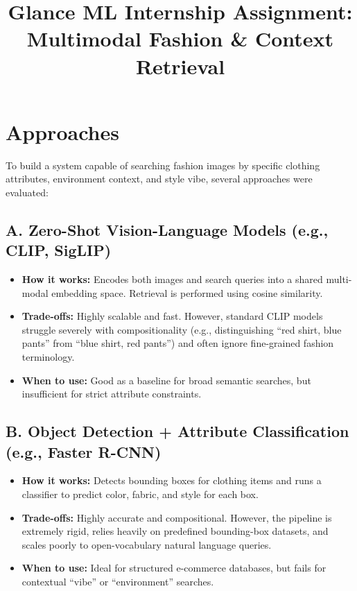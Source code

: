 \documentclass[11pt,a4paper]{article}
\title{Glance ML Internship Assignment: \\ Multimodal Fashion \& Context Retrieval}
\author{}
\date{}
\begin{document}
\maketitle

\section{Approaches}
To build a system capable of searching fashion images by specific clothing attributes, environment context, and style vibe, several approaches were evaluated:

\subsection*{A. Zero-Shot Vision-Language Models (e.g., CLIP, SigLIP)}
\begin{itemize}
    \item \textbf{How it works:} Encodes both images and search queries into a shared multi-modal embedding space. Retrieval is performed using cosine similarity.
    \item \textbf{Trade-offs:} Highly scalable and fast. However, standard CLIP models struggle severely with compositionality (e.g., distinguishing ``red shirt, blue pants'' from ``blue shirt, red pants'') and often ignore fine-grained fashion terminology.
    \item \textbf{When to use:} Good as a baseline for broad semantic searches, but insufficient for strict attribute constraints.
\end{itemize}

\subsection*{B. Object Detection + Attribute Classification (e.g., Faster R-CNN)}
\begin{itemize}
    \item \textbf{How it works:} Detects bounding boxes for clothing items and runs a classifier to predict color, fabric, and style for each box.
    \item \textbf{Trade-offs:} Highly accurate and compositional. However, the pipeline is extremely rigid, relies heavily on predefined bounding-box datasets, and scales poorly to open-vocabulary natural language queries.
    \item \textbf{When to use:} Ideal for structured e-commerce databases, but fails for contextual ``vibe'' or ``environment'' searches.
\end{itemize}
\end{document}

